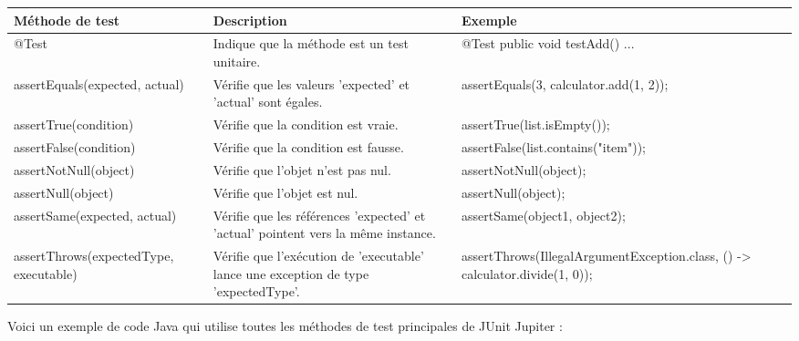 \begin{table}[H]
	\begin{adjustbox}{max width=\textwidth}
		\begin{tabular}{l|p{10em}|l}
			\toprule
			\textbf{Méthode de test} & \textbf{Description} & \textbf{Exemple} \\ \midrule
			{@}Test & Indique que la méthode est un test unitaire. & {@}Test public void testAdd() {...} \\
			assertEquals(expected, actual) & Vérifie que les valeurs 'expected' et 'actual' sont égales. & assertEquals(3, calculator.add(1, 2)); \\ 
			assertTrue(condition) & Vérifie que la condition est vraie. & assertTrue(list.isEmpty()); \\ 
			assertFalse(condition) & Vérifie que la condition est fausse. & assertFalse(list.contains("item")); \\
			assertNotNull(object) & Vérifie que l'objet n'est pas nul. & assertNotNull(object); \\ 
			assertNull(object) & Vérifie que l'objet est nul. & assertNull(object); \\ 
			assertSame(expected, actual) & Vérifie que les références 'expected' et 'actual' pointent vers la même instance. & assertSame(object1, object2); \\ 
			assertThrows(expectedType, executable) & Vérifie que l'exécution de 'executable' lance une exception de type 'expectedType'. & assertThrows(IllegalArgumentException.class, () -> calculator.divide(1, 0)); \\
			\bottomrule
		\end{tabular}
	\end{adjustbox}
\end{table}

Voici un exemple de code Java qui utilise toutes les méthodes de test principales de JUnit Jupiter :

